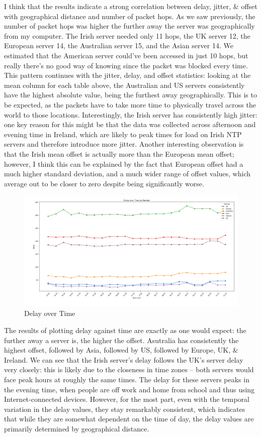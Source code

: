 \documentclass[a4paper]{article}
\begin{document}
I think that the results indicate a strong correlation between delay, jitter, \& offset with geographical distance and number of packet hops.
As we saw previously, the number of packet hops was higher the further away the server was geographically from my computer.
The Irish server needed only 11 hops, the UK server 12, the European server 14, the Australian server 15, and the Asian server 14.
We estimated that the American server could've been accessed in just 10 hops, but really there's no good way of knowing since the packet was blocked every time.
This pattern continues with the jitter, delay, and offset statistics:
looking at the mean column for each table above, the Australian and US servers consistently have the highest absolute value, being the furthest away geographically.
This is to be expected, as the packets have to take more time to physically travel across the world to those locations.
Interestingly, the Irish server has consistently high jitter: one key reason for this might be that the data was collected across afternoon and evening time in Ireland, which are likely to peak times for load on Irish NTP servers and therefore introduce more jitter.
Another interesting observation is that the Irish mean offset is actually more than the European mean offset; however, I think this can be explained by the fact that European offset had a much higher standard deviation, and a much wider range of offset values, which average out to be closer to zero despite being significantly worse.

\begin{figure}[H]
    \centering
    \includegraphics[width=\textwidth]{./images/delayplot.png}
    \caption{Delay over Time}
\end{figure}

The results of plotting delay against time are exactly as one would expect:
the further away a server is, the higher the offset.
Asutralia has consistently the highest offset, followed by Asia, followed by US, followed by Europe, UK, \& Ireland.
We can see that the Irish server's delay follows the UK's server delay very closely:
this is likely due to the closeness in time zones -- both servers would face peak hours at roughly the same times.
The delay for these servers peaks in the evening time, when people are off work and home from school and thus using Internet-connected devices.
However, for the most part, even with the temporal variation in the delay values, they stay remarkably consistent, which indicates that while they are somewhat dependent on the time of day, the delay values are primarily determined by geographical distance.
\end{document}
